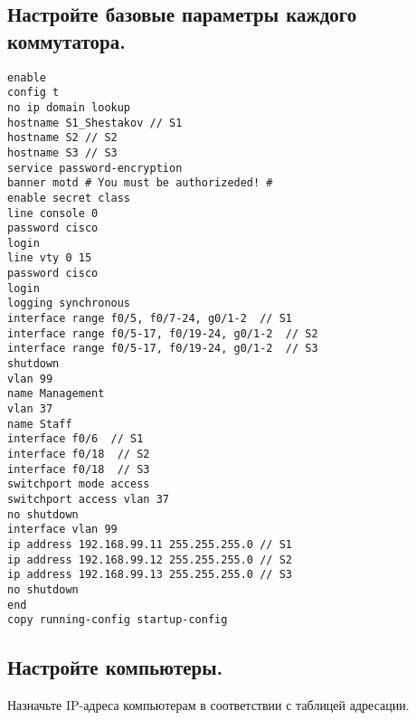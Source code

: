 \subsection{Настройте базовые параметры каждого коммутатора.}
\begin{verbatim}
enable
config t
no ip domain lookup
hostname S1_Shestakov // S1
hostname S2 // S2
hostname S3 // S3
service password-encryption
banner motd # You must be authorizeded! #
enable secret class
line console 0
password cisco
login
line vty 0 15
password cisco
login
logging synchronous
interface range f0/5, f0/7-24, g0/1-2  // S1
interface range f0/5-17, f0/19-24, g0/1-2  // S2
interface range f0/5-17, f0/19-24, g0/1-2  // S3
shutdown
vlan 99
name Management
vlan 37
name Staff
interface f0/6  // S1
interface f0/18  // S2
interface f0/18  // S3
switchport mode access
switchport access vlan 37
no shutdown
interface vlan 99
ip address 192.168.99.11 255.255.255.0 // S1
ip address 192.168.99.12 255.255.255.0 // S2
ip address 192.168.99.13 255.255.255.0 // S3
no shutdown
end
copy running-config startup-config
\end{verbatim}

\subsection{Настройте компьютеры.}
Назначьте IP-адреса компьютерам в соответствии с таблицей адресации.
